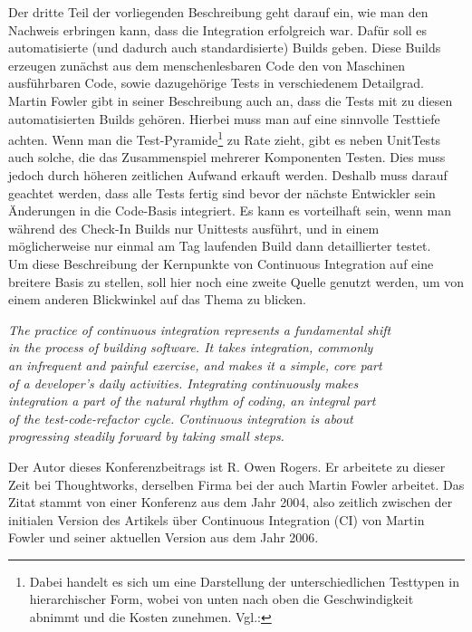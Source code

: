 Der dritte Teil der vorliegenden Beschreibung geht darauf ein, wie man den Nachweis erbringen kann, dass die Integration erfolgreich war. Dafür soll es automatisierte (und dadurch auch standardisierte) Builds geben. Diese Builds erzeugen zunächst aus dem menschenlesbaren Code den von Maschinen ausführbaren Code, sowie dazugehörige Tests in verschiedenem Detailgrad. Martin Fowler gibt in seiner Beschreibung auch an, dass die Tests mit zu diesen automatisierten Builds gehören. Hierbei muss man auf eine sinnvolle Testtiefe achten. Wenn man die Test-Pyramide\footnote{Dabei handelt es sich um eine Darstellung der unterschiedlichen Testtypen in hierarchischer Form, wobei von unten nach oben die Geschwindigkeit abnimmt und die Kosten zunehmen. Vgl.:\cite{fowler-Testpyramid}} zu Rate zieht, gibt es neben UnitTests auch solche, die das Zusammenspiel mehrerer Komponenten Testen. Dies muss jedoch durch höheren zeitlichen Aufwand erkauft werden. Deshalb muss darauf geachtet werden, dass alle Tests fertig sind bevor der nächste Entwickler sein Änderungen in die Code-Basis integriert. Es kann es vorteilhaft sein, wenn man während des Check-In Builds nur Unittests ausführt, und in einem möglicherweise nur einmal am Tag laufenden Build dann detaillierter testet.\\
Um diese Beschreibung der Kernpunkte von Continuous Integration auf eine breitere Basis zu stellen, soll hier noch eine zweite Quelle genutzt werden, um von einem anderen Blickwinkel auf das Thema zu blicken.
\begin{center}
	\textit{
The practice of continuous integration represents a fundamental shift\\ in the process of building software. It takes integration, commonly\\
an infrequent and painful exercise, and makes it a simple, core part\\ of a developer’s daily activities. Integrating continuously makes\\ integration a part of the natural rhythm of coding, an integral part\\ of the test-code-refactor cycle. Continuous integration is about\\ progressing steadily forward by taking small steps.}\\ \cite{10.1007/978-3-540-24853-8_8}
\end{center}
Der Autor dieses Konferenzbeitrags ist R. Owen Rogers. Er arbeitete zu dieser Zeit bei Thoughtworks, derselben Firma bei der auch Martin Fowler arbeitet. Das Zitat stammt von einer Konferenz aus dem Jahr 2004, also zeitlich zwischen der initialen Version des Artikels über Continuous Integration (CI) von Martin Fowler und seiner aktuellen Version aus dem Jahr 2006.\\
